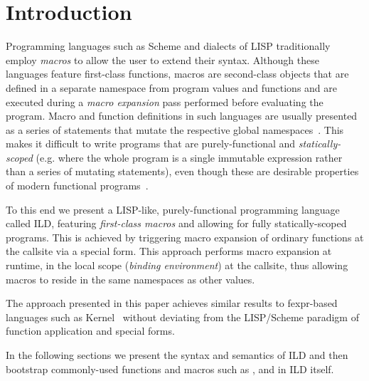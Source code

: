 \section{Introduction}
\label{introduction}
Programming languages such as Scheme and dialects of LISP traditionally employ
\emph{macros}
to allow the user to extend their syntax. Although these languages
feature first-class functions, macros are second-class objects
that are defined in a separate namespace from program values and functions
and are executed during a \emph{macro expansion} pass performed
before evaluating the program. Macro and function definitions in
such languages are usually presented as a series of statements that
mutate the respective global namespaces~\cite{steele-gabriel-evolution,sicp}.
This makes it difficult to
write programs that are purely-functional and \emph{statically-scoped}
(e.g. where the whole program is a single immutable expression rather
than a series of mutating statements), even though these are desirable
properties of modern functional programs~\cite{sicp,hudak-conception}.

To this end we present a LISP-like,
purely-functional programming language called ILD, featuring \emph{first-class macros}
and allowing for fully statically-scoped programs. This is achieved by
triggering macro expansion of ordinary functions at the callsite via
a special form. This approach performs macro expansion at runtime,
in the local scope (\emph{binding environment}) at the callsite,
thus allowing macros to reside in the same namespaces as other values.

The approach presented in this paper achieves similar results to
fexpr-based languages such as Kernel~\cite{kernel-report,fexpr-shutt}
without deviating from the LISP/Scheme paradigm of function application
and special forms.

In the following sections we present the syntax and semantics of ILD and then
bootstrap commonly-used functions and macros such as ,
 and  in ILD itself.
